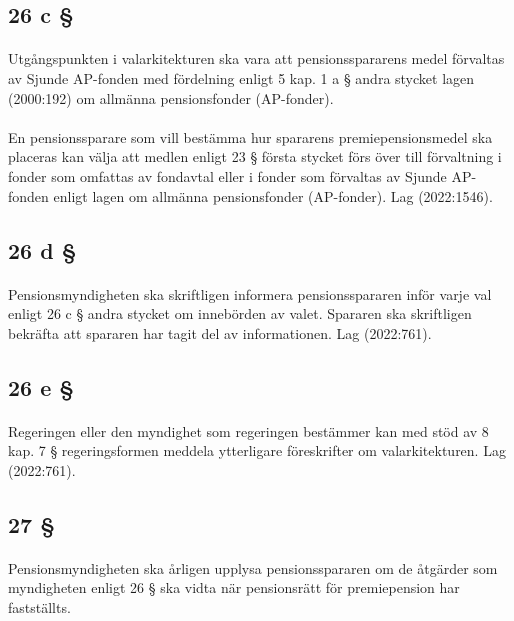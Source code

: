 \documentclass[a4paper,notitlepage,openany,10pt]{book}
\begin{document}
\subsection*{26 c §}
\paragraph*{}
Utgångspunkten i valarkitekturen ska vara att pensionsspararens medel förvaltas av Sjunde AP-fonden med fördelning enligt 5 kap. 1 a § andra stycket lagen (2000:192) om allmänna pensionsfonder (AP-fonder).
\paragraph*{}
En pensionssparare som vill bestämma hur spararens premiepensionsmedel ska placeras kan välja att medlen enligt 23 § första stycket förs över till förvaltning i fonder som omfattas av fondavtal eller i fonder som förvaltas av Sjunde AP-fonden enligt lagen om allmänna pensionsfonder (AP-fonder).
Lag (2022:1546).
\subsection*{26 d §}
\paragraph*{}
Pensionsmyndigheten ska skriftligen informera pensionsspararen inför varje val enligt 26 c § andra stycket om innebörden av valet. Spararen ska skriftligen bekräfta att spararen har tagit del av informationen.
Lag (2022:761).
\subsection*{26 e §}
\paragraph*{}
Regeringen eller den myndighet som regeringen bestämmer kan med stöd av 8 kap. 7 § regeringsformen meddela ytterligare föreskrifter om valarkitekturen.
Lag (2022:761).
\subsection*{27 §}
\paragraph*{}
Pensionsmyndigheten ska årligen upplysa pensionsspararen om de åtgärder som myndigheten enligt 26 § ska vidta när pensionsrätt för premiepension har fastställts.
\end{document}
